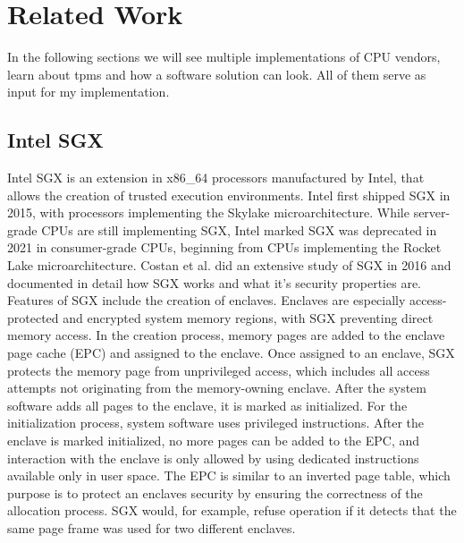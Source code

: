 \chapter{Related Work}
\label{chap:related}

In the following sections we will see multiple implementations of CPU vendors,
learn about \glspl{tpm} and how a software solution can look. All of them serve
as input for my implementation.

\section{Intel SGX}
\label{sec:20:sgx}
Intel SGX is an extension in x86\_64 processors manufactured by Intel, that
allows the creation of trusted execution environments. Intel first shipped SGX
in 2015, with processors implementing the Skylake microarchitecture. While
server-grade CPUs are still implementing SGX, Intel marked SGX was deprecated in
2021 in consumer-grade CPUs, beginning from CPUs implementing the Rocket Lake
microarchitecture. Costan et al. did an extensive study of SGX in 2016 and
documented in detail how SGX works and what it's security properties
are.\cite{costan2016intel} \\

Features of SGX include the creation of enclaves. Enclaves are especially
access-protected and encrypted system memory regions, with SGX preventing direct
memory access. In the creation process, memory pages are added to the enclave
page cache (EPC) and assigned to the enclave. Once assigned to an enclave, SGX
protects the memory page from unprivileged access, which includes all access
attempts not originating from the memory-owning enclave. After the system
software adds all pages to the enclave, it is marked as initialized. For the
initialization process, system software uses privileged instructions. After the
enclave is marked initialized, no more pages can be added to the EPC, and
interaction with the enclave is only allowed by using dedicated instructions
available only in user space. The EPC is similar to an inverted page table,
which purpose is to protect an enclaves security by ensuring the correctness of
the allocation process. SGX would, for example, refuse operation if it detects
that the same page frame was used for two different enclaves.\\

